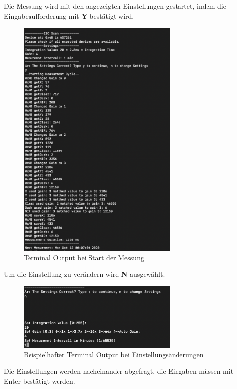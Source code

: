Die Messung wird mit den angezeigten Einstellungen gestartet, indem die Eingabeaufforderung mit \textbf{Y} bestätigt wird.\\
\begin{figure}[H]
\centering
\includegraphics[width=0.7\textwidth]{img/handbuch/y_start_measurement}
\caption{Terminal Output bei Start der Messung }
\label{fig:Start-der-Messung}
\end{figure}

Um die Einstellung zu verändern wird \textbf{N} ausgewählt.\\
\begin{figure}[H]
\centering
\includegraphics[width=0.7\textwidth]{img/handbuch/n_change_settings}
\caption{Beispielhafter Terminal Output bei Einstellungsänderungen}
\label{fig:changesettings}
\end{figure}
\noindent Die Einstellungen werden nacheinander abgefragt, die Eingaben müssen mit Enter bestätigt werden.\medskip

